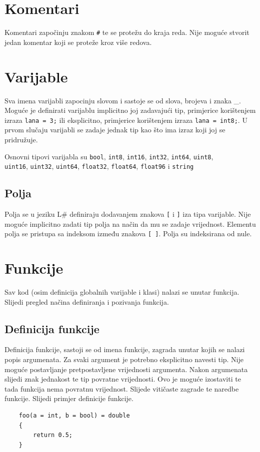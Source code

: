 \documentclass[times, utf8, zavrsni]{fer}
\begin{document}
\section{Komentari}
Komentari započinju znakom \verb|#| te se protežu do kraja reda. Nije moguće 
stvorit jedan komentar koji se proteže kroz više redova.

\section{Varijable}
Sva imena varijabli zapocinju slovom i sastoje se od slova, brojeva i znaka \_. Moguće je definirati varijablu implicitno joj zadavajući tip, primjerice korištenjem
izraza \verb|lana = 3;| ili eksplicitno, primjerice korištenjem izraza \verb|lana = int8;|. U prvom slučaju varijabli se zadaje jednak tip kao što ima izraz
koji joj se pridružuje.

Osnovni tipovi varijabla su \verb|bool|, 
\verb|int8|,  \verb|int16|,  \verb|int32|,  \verb|int64|, 
\verb|uint8|, \\  \verb|uint16|,  \verb|uint32|,  \verb|uint64|, 
\verb|float32|,  \verb|float64|,  \verb|float96| i \verb|string|

\subsection{Polja}
Polja se u jeziku L\# definiraju dodavanjem znakova \verb|[| i \verb|]| iza tipa varijable. Nije moguće implicitno zadati tip polja na način da mu se zadaje vrijednost.
Elementu polja se pristupa sa indeksom između znakova \verb|[ ]|. Polja su indeksirana od nule.

\section{Funkcije}
Sav kod (osim definicija globalnih varijable i klasi) nalazi se unutar funkcija. Slijedi pregled načina definiranja i pozivanja funkcija.
\subsection{Definicija funkcije}
Definicija funkcije, sastoji se od imena funkcije, zagrada unutar kojih se nalazi popis argumenata. Za svaki argument je potrebno eksplicitno navesti tip. Nije moguće 
postavljanje pretpostavljene vrijednosti argumenta. Nakon argumenata slijedi znak jednakost te tip povratne vrijednosti. Ovo je moguće izostaviti te tada funkcija nema 
povratnu vrijednost. Slijede vitičaste zagrade te naredbe funkcije. Slijedi primjer definicije funkcije.
\begin{verbatim}
    foo(a = int, b = bool) = double
    {
        return 0.5;
    }
\end{verbatim}
\end{document}

